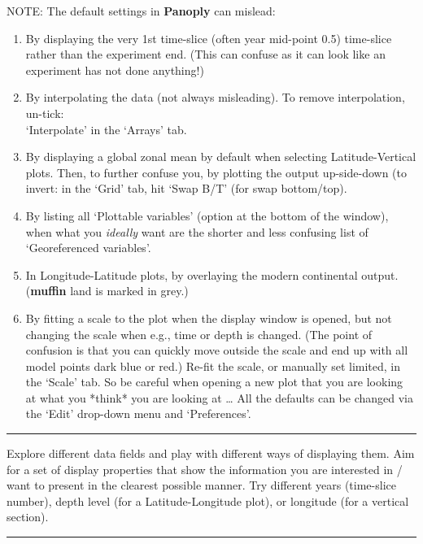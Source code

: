 \documentclass[11pt,fleqn]{book} %
\begin{document}
NOTE: The default settings in \textbf{Panoply} can mislead:
\begin{enumerate}
\item By displaying the very 1st time-slice (often year mid-point 0.5) time-slice rather than the experiment end. (This can confuse as it can look like an experiment has not done anything!)
\item By interpolating the data (not always misleading). To remove interpolation, un-tick:
\\‘\textsf{Interpolate}’ in the ‘\textsf{Arrays}’ tab.
\item By displaying a global zonal mean by default when selecting \textsf{Latitude-Vertical} plots. Then, to further confuse you, by plotting the output up-side-down (to invert: in the ‘\textsf{Grid}’ tab, hit ‘\textsf{Swap B/T}’ (for swap bottom/top). 
\item By listing all ‘\textsf{Plottable variables}’ (option at the bottom of the window), when what you \textit{ideally} want are  the shorter and less confusing list of ‘\textsf{Georeferenced variables}’. 
\item In \textsf{Longitude-Latitude} plots, by overlaying the modern continental output. (\textbf{muffin} land is marked in grey.)
\item By fitting a scale to the plot when the display window is opened, but not changing the scale when e.g., time or depth is changed. (The point of confusion is that you can quickly move outside the scale and end up with all model points dark blue or red.) Re-fit the scale, or manually set limited, in the ‘\textsf{Scale}’ tab. 
So be careful when opening a new plot that you are looking at what you *think* you are looking at …
All the defaults can be changed via the ‘\textsf{Edit}’ drop-down menu and ‘\textsf{Preferences}’.
\end{enumerate}

\vspace{1mm}
\noindent\rule{4cm}{0.1mm}
\vspace{2mm}

\noindent Explore different data fields and play with different ways of displaying them. Aim for a set of display properties that show the information you are interested in / want to present in the clearest possible manner. Try different years (time-slice number), depth level (for a Latitude-Longitude plot), or longitude (for a vertical section).

\vspace{1mm}
\noindent\rule{4cm}{0.1mm}
\vspace{2mm}
\end{document}
